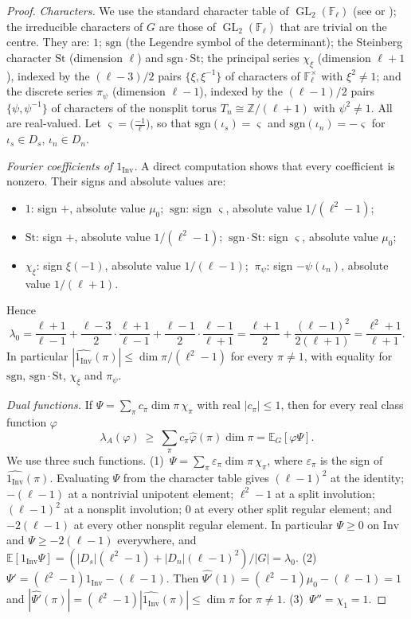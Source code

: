 \documentclass[11pt]{amsart}
\theoremstyle{definition}
\theoremstyle{remark}
\newcommand{\Z}{\mathbb{Z}}
\newcommand{\F}{\mathbb{F}}
\DeclareMathOperator{\GL}{GL}
\newcommand{\Inv}{\mathrm{Inv}}
\begin{document}
\begin{proof}
\emph{Characters.} We use the standard character table of $\GL_2(\F_\ell)$ (see \cite[\S5.2]{FH} or \cite{PS83});
the irreducible characters of $G$ are those of $\GL_2(\F_\ell)$ that are trivial on the centre. They are: $1$; $\mathrm{sgn}$ (the Legendre symbol of the
determinant); the Steinberg character $\mathrm{St}$ (dimension $\ell$) and $\mathrm{sgn}\cdot\mathrm{St}$; the
principal series $\chi_\xi$ (dimension $\ell+1$), indexed by the $(\ell-3)/2$ pairs $\{\xi,\xi^{-1}\}$ of characters of
$\F_\ell^\times$ with $\xi^2\ne1$; and the discrete series $\pi_\psi$ (dimension $\ell-1$), indexed by the $(\ell-1)/2$
pairs $\{\psi,\psi^{-1}\}$ of characters of the nonsplit torus $T_n\cong\Z/(\ell+1)$ with $\psi^2\ne1$. All are
real-valued. Let $\varsigma=\bigl(\frac{-1}{\ell}\bigr)$, so that $\mathrm{sgn}(\iota_s)=\varsigma$ and
$\mathrm{sgn}(\iota_n)=-\varsigma$ for $\iota_s\in D_s$, $\iota_n\in D_n$.

\emph{Fourier coefficients of $1_{\Inv}$.} A direct computation shows that every coefficient is nonzero. Their signs
and absolute values are:
\begin{itemize}
\item $1$: sign $+$, absolute value $\mu_0$; $\ \mathrm{sgn}$: sign $\varsigma$, absolute value $1/(\ell^2-1)$;
\item $\mathrm{St}$: sign $+$, absolute value $1/(\ell^2-1)$; $\ \mathrm{sgn}\cdot\mathrm{St}$: sign $\varsigma$, absolute value $\mu_0$;
\item $\chi_\xi$: sign $\xi(-1)$, absolute value $1/(\ell-1)$; $\ \pi_\psi$: sign $-\psi(\iota_n)$, absolute value $1/(\ell+1)$.
\end{itemize}
Hence
\[
\lambda_0=\frac{\ell+1}{\ell-1}+\frac{\ell-3}{2}\cdot\frac{\ell+1}{\ell-1}+\frac{\ell-1}{2}\cdot\frac{\ell-1}{\ell+1}
=\frac{\ell+1}{2}+\frac{(\ell-1)^2}{2(\ell+1)}=\frac{\ell^2+1}{\ell+1}.
\]
In particular $|\widehat{1_{\Inv}}(\pi)|\le\dim\pi/(\ell^2-1)$ for every $\pi\ne1$, with equality for $\mathrm{sgn}$,
$\mathrm{sgn}\cdot\mathrm{St}$, $\chi_\xi$ and $\pi_\psi$.

\emph{Dual functions.} If $\Psi=\sum_\pi c_\pi\dim\pi\,\chi_\pi$ with real $|c_\pi|\le1$, then for every real class
function $\varphi$
\[
  \lambda_A(\varphi)\ \ge\ \sum_\pi c_\pi\widehat\varphi(\pi)\dim\pi=\mathbb{E}_G[\varphi\Psi].
\]
We use three such functions.
(1)~$\Psi=\sum_\pi\varepsilon_\pi\dim\pi\,\chi_\pi$, where $\varepsilon_\pi$ is the sign of $\widehat{1_{\Inv}}(\pi)$.
Evaluating $\Psi$ from the character table gives $(\ell-1)^2$ at the identity; $-(\ell-1)$ at a nontrivial unipotent
element; $\ell^2-1$ at a split involution; $(\ell-1)^2$ at a nonsplit involution; $0$ at every other split regular
element; and $-2(\ell-1)$ at every other nonsplit regular element. In particular $\Psi\ge0$ on $\Inv$ and $\Psi\ge-2(\ell-1)$ everywhere,
and $\mathbb{E}[1_{\Inv}\Psi]=(|D_s|(\ell^2-1)+|D_n|(\ell-1)^2)/|G|=\lambda_0$.
(2)~$\Psi'=(\ell^2-1)1_{\Inv}-(\ell-1)$. Then $\widehat{\Psi'}(1)=(\ell^2-1)\mu_0-(\ell-1)=1$ and
$|\widehat{\Psi'}(\pi)|=(\ell^2-1)|\widehat{1_{\Inv}}(\pi)|\le\dim\pi$ for $\pi\ne1$.
(3)~$\Psi''=\chi_1=1$.


\end{proof}
\end{document}

